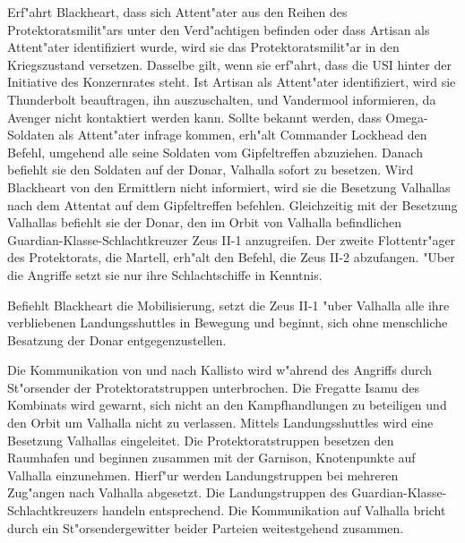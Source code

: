 
Erf"ahrt Blackheart, dass sich Attent"ater aus den Reihen des Protektoratsmilit"ars unter den Verd"achtigen befinden oder dass Artisan als Attent"ater identifiziert wurde, wird sie das Protektoratsmilit"ar in den Kriegszustand versetzen. Dasselbe gilt, wenn sie erf"ahrt, dass die USI hinter der Initiative des Konzernrates steht. Ist Artisan als Attent"ater identifiziert, wird sie Thunderbolt beauftragen, ihn auszuschalten, und Vandermool informieren, da Avenger nicht kontaktiert werden kann. Sollte bekannt werden, dass Omega-Soldaten als Attent"ater infrage kommen, erh"alt Commander Lockhead den Befehl, umgehend alle seine Soldaten vom Gipfeltreffen abzuziehen. Danach befiehlt sie den Soldaten auf der Donar, Valhalla sofort zu besetzen. Wird Blackheart von den Ermittlern nicht informiert, wird sie die Besetzung Valhallas nach dem Attentat auf dem Gipfeltreffen befehlen. Gleichzeitig mit der Besetzung Valhallas befiehlt sie der Donar, den im Orbit von Valhalla befindlichen Guardian-Klasse-Schlachtkreuzer Zeus II-1 anzugreifen. Der zweite Flottentr"ager des Protektorats, die Martell, erh"alt den Befehl, die Zeus II-2 abzufangen. "Uber die Angriffe setzt sie nur ihre Schlachtschiffe in Kenntnis.

Befiehlt Blackheart die Mobilisierung, setzt die Zeus II-1 "uber Valhalla alle ihre verbliebenen Landungsshuttles in Bewegung und beginnt, sich ohne menschliche Besatzung der Donar entgegenzustellen.

Die Kommunikation von und nach Kallisto wird w"ahrend des Angriffs durch St"orsender der Protektoratstruppen unterbrochen. Die Fregatte Isamu des Kombinats wird gewarnt, sich nicht an den Kampfhandlungen zu beteiligen und den Orbit um Valhalla nicht zu verlassen. Mittels Landungsshuttles wird eine Besetzung Valhallas eingeleitet. Die Protektoratstruppen besetzen den Raumhafen und beginnen zusammen mit der Garnison, Knotenpunkte auf Valhalla einzunehmen. Hierf"ur werden Landungstruppen bei mehreren Zug"angen nach Valhalla abgesetzt. Die Landungstruppen des Guardian-Klasse-Schlachtkreuzers handeln entsprechend. Die Kommunikation auf Valhalla bricht durch ein St"orsendergewitter beider Parteien weitestgehend zusammen. 


